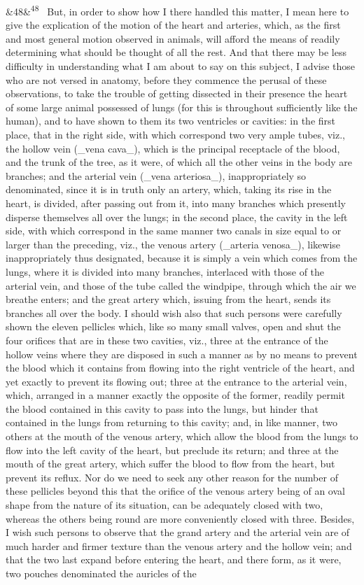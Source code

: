 \documentclass[12pt]{article}
\newcommand{\para}[1][]{\par\noindent\ifx&#1&\else\textsuperscript{\footnotesize #1}~\fi}
\begin{document}
\para[48] But, in order to show how I there handled this matter, I mean here to give the explication of the motion of the heart and arteries, which, as the first and most general motion observed in animals, will afford the means of readily determining what should be thought of all the rest. And that there may be less difficulty in understanding what I am about to say on this subject, I advise those who are not versed in anatomy, before they commence the perusal of these observations, to take the trouble of getting dissected in their presence the heart of some large animal possessed of lungs (for this is throughout sufficiently like the human), and to have shown to them its two ventricles or cavities: in the first place, that in the right side, with which correspond two very ample tubes, viz., the hollow vein (\_vena cava\_), which is the principal receptacle of the blood, and the trunk of the tree, as it were, of which all the other veins in the body are branches; and the arterial vein (\_vena arteriosa\_), inappropriately so denominated, since it is in truth only an artery, which, taking its rise in the heart, is divided, after passing out from it, into many branches which presently disperse themselves all over the lungs; in the second place, the cavity in the left side, with which correspond in the same manner two canals in size equal to or larger than the preceding, viz., the venous artery (\_arteria venosa\_), likewise inappropriately thus designated, because it is simply a vein which comes from the lungs, where it is divided into many branches, interlaced with those of the arterial vein, and those of the tube called the windpipe, through which the air we breathe enters; and the great artery which, issuing from the heart, sends its branches all over the body. I should wish also that such persons were carefully shown the eleven pellicles which, like so many small valves, open and shut the four orifices that are in these two cavities, viz., three at the entrance of the hollow veins where they are disposed in such a manner as by no means to prevent the blood which it contains from flowing into the right ventricle of the heart, and yet exactly to prevent its flowing out; three at the entrance to the arterial vein, which, arranged in a manner exactly the opposite of the former, readily permit the blood contained in this cavity to pass into the lungs, but hinder that contained in the lungs from returning to this cavity; and, in like manner, two others at the mouth of the venous artery, which allow the blood from the lungs to flow into the left cavity of the heart, but preclude its return; and three at the mouth of the great artery, which suffer the blood to flow from the heart, but prevent its reflux. Nor do we need to seek any other reason for the number of these pellicles beyond this that the orifice of the venous artery being of an oval shape from the nature of its situation, can be adequately closed with two, whereas the others being round are more conveniently closed with three. Besides, I wish such persons to observe that the grand artery and the arterial vein are of much harder and firmer texture than the venous artery and the hollow vein; and that the two last expand before entering the heart, and there form, as it were, two pouches denominated the auricles of the 
\end{document}
